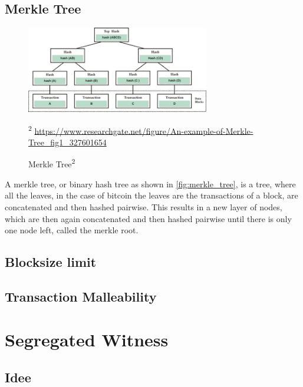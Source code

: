 \subsection{Merkle Tree}
\begin{figure}[!ht]
    \centering
    \includegraphics[width=8cm]{Ausarbeitung/images/merkle_tree.png}
    \caption[Merkle Tree]{Merkle Tree\textsuperscript{2}}
    \small\textsuperscript{2} \url{https://www.researchgate.net/figure/An-example-of-Merkle-Tree_fig1_327601654}
    \label{fig:merkle_tree}
\end{figure}
A merkle tree, or binary hash tree as shown in \autoref{fig:merkle_tree}, is a tree, where all the leaves, in the case of bitcoin the leaves are the transactions of a block, are concatenated and then hashed pairwise. This results in a new layer of nodes, which are then again concatenated and then hashed pairwise until there is only one node left, called the merkle root.


\subsection{Blocksize limit}
\label{sec:Basics:BlocksizeLimit}


\subsection{Transaction Malleability}
\label{ch:TransactionMalleability}




\section{Segregated Witness}
\label{ch:SegWit}


\subsection{Idee}
\label{sec:SegWit:Idee}

